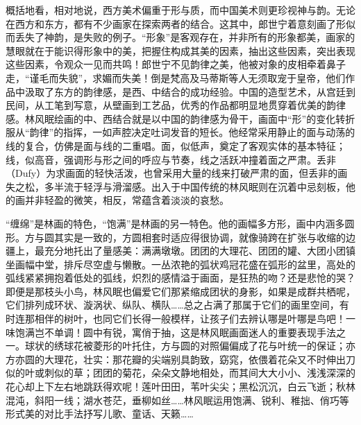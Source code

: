 \documentclass{article}
\begin{document}
概括地看，相对地说，西方美术偏重于形与质，而中国美术则更珍视神与韵。无论在西方和东方，都有不少画家在探索两者的结合。这其中，郎世宁着意刻画了形似而丢失了神韵，是失败的例子。“形象”是客观存在，并非所有的形象都美，画家的慧眼就在于能识得形象中的美，把握住构成其美的因素，抽出这些因素，突出表现这些因素，令观众一见而共鸣！郎世宁不见韵律之美，他被对象的皮相牵着鼻子走，“谨毛而失貌”，求媚而失美！倒是梵高及马蒂斯等人无须取宠于皇帝，他们作品中汲取了东方的韵律感，是西、中结合的成功经验。中国的造型艺术，从宫廷到民间，从工笔到写意，从壁画到工艺品，优秀的作品都明显地贯穿着优美的韵律感。林风眠绘画的中、西结合就是以中国的韵律感为骨干，画面中“形”的变化转折服从“韵律”的指挥，一如声腔决定吐词发音的短长。他经常采用静止的面与动荡的线的复合，仿佛是面与线的二重唱。面，似低声，奠定了客观实体的基本特征；线，似高音，强调形与形之间的呼应与节奏，线之活跃冲撞着面之严肃。丢非（Dufy）为求画面的轻快活泼，也曾采用大量的线来打破严肃的面，但丢非的画失之松，多半流于轻浮与滑溜感。出入于中国传统的林风眠则在沉着中忌刻板，他的画并非轻盈的微笑，相反，常蕴含着淡淡的哀愁。

“缠绵”是林画的特色，“饱满”是林画的另一特色。他的画幅多方形，画中内涵多圆形。方与圆其实是一致的，方圆相套时适应得很协调，就像骑跨在扩张与收缩的边疆上，最充分地托出了量感美：满满墩墩。团团的大理花、团团的罐、大团小团镇坐画幅中堂，排斥尽空虚与懒散。一丛浓艳的弧状鸡冠花盛在弧形的盆里，高处的弧线紧紧拥抱着低处的弧线，炽烈的感情溢于画面，是狂热的吻？还是悲怆的哭？即便是那枝头小鸟，林风眠也偏爱它们那紧缩成团状的身影，如果是成群共栖呢，它们排列成环状、漩涡状、纵队、横队……总之占满了那属于它们的画里空间，有时连那相伴的树叶，也同它们长得一般模样，让孩子们去辨认哪是叶哪是鸟吧！一味饱满岂不单调！圆中有锐，寓俏于抽，这是林风眠画面迷人的重要表现手法之一。球状的绣球花被菱形的叶托住，方与圆的对照偏偏成了花与叶统一的保证；亦方亦圆的大理花，壮实：那花瓣的尖端别具韵致，窈窕，依偎着花朵又不时伸出刀似的叶或刺似的草；团团的菊花，朵朵文静地相处，而其间大大小小、浅浅深深的花心却上下左右地跳跃得欢呢！莲叶田田，苇叶尖尖；黑松沉沉，白云飞逝；秋林混沌，斜阳一线；湖水苍茫，垂柳如丝……林风眠运用饱满、锐利、稚拙、俏巧等形式美的对比手法抒写儿歌、童话、天籁……
\end{document}
